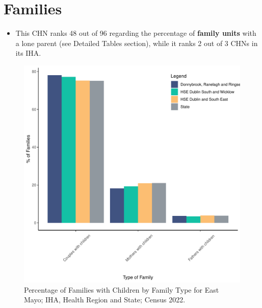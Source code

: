 \documentclass{article}
\begin{document}
\section{Families}\label{sect:Fam}
\begin{itemize}
\item This CHN ranks  48 out of 96 regarding the percentage of \textbf{family units} with a lone parent (see Detailed Tables section), while it ranks   2 out of 3 CHNs in its IHA.
\end{itemize}
\begin{figure}[H]
	\centering
	\includegraphics[width = 150mm]{../figures/FamED.pdf}
	\caption{Percentage of Families with Children by Family Type for East Mayo; IHA, Health Region and State; Census 2022.}
	\label{fig:vbnv}
	\end{figure}
	
\end{document}
